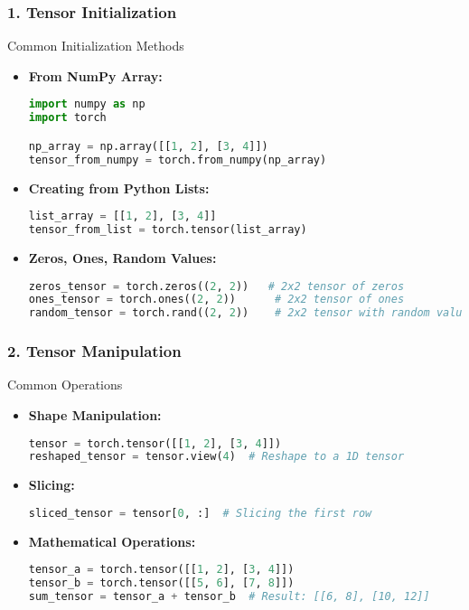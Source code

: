\documentclass[aspectratio=169]{beamer}
\begin{document}
\begin{frame}[fragile]
    \frametitle{1. Tensor Initialization}
    \begin{block}{Common Initialization Methods}
        \begin{itemize}
            \item \textbf{From NumPy Array:}
            \begin{lstlisting}[language=Python]
import numpy as np
import torch

np_array = np.array([[1, 2], [3, 4]])
tensor_from_numpy = torch.from_numpy(np_array)
            \end{lstlisting}
            
            \item \textbf{Creating from Python Lists:}
            \begin{lstlisting}[language=Python]
list_array = [[1, 2], [3, 4]]
tensor_from_list = torch.tensor(list_array)
            \end{lstlisting}

            \item \textbf{Zeros, Ones, Random Values:}
            \begin{lstlisting}[language=Python]
zeros_tensor = torch.zeros((2, 2))   # 2x2 tensor of zeros
ones_tensor = torch.ones((2, 2))      # 2x2 tensor of ones
random_tensor = torch.rand((2, 2))    # 2x2 tensor with random values
            \end{lstlisting}
        \end{itemize}
    \end{block}
\end{frame}

\begin{frame}[fragile]
    \frametitle{2. Tensor Manipulation}
    \begin{block}{Common Operations}
        \begin{itemize}
            \item \textbf{Shape Manipulation:}
            \begin{lstlisting}[language=Python]
tensor = torch.tensor([[1, 2], [3, 4]])
reshaped_tensor = tensor.view(4)  # Reshape to a 1D tensor
            \end{lstlisting}

            \item \textbf{Slicing:}
            \begin{lstlisting}[language=Python]
sliced_tensor = tensor[0, :]  # Slicing the first row
            \end{lstlisting}

            \item \textbf{Mathematical Operations:}
            \begin{lstlisting}[language=Python]
tensor_a = torch.tensor([[1, 2], [3, 4]])
tensor_b = torch.tensor([[5, 6], [7, 8]])
sum_tensor = tensor_a + tensor_b  # Result: [[6, 8], [10, 12]]
            \end{lstlisting}
        \end{itemize}
    \end{block}
\end{frame}
\end{document}
